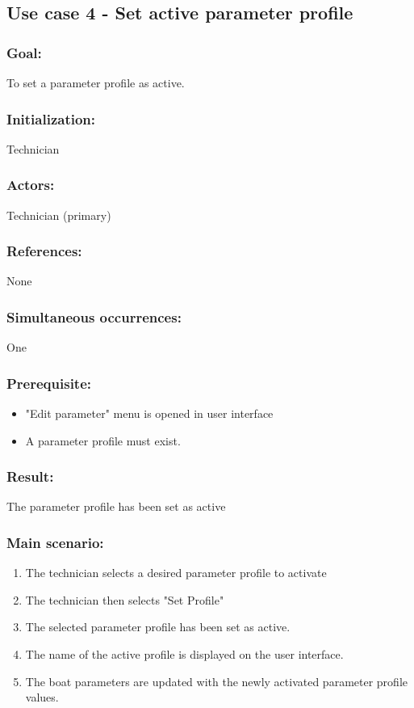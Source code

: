 \begin{framed}
	\subsection{Use case 4 - Set active parameter profile}
	\subsubsection*{Goal:}
	To set a parameter profile as active.
	
	\subsubsection*{Initialization:}
	Technician
	
	\subsubsection*{Actors:}
	Technician (primary)
	
	\subsubsection*{References:}
	None
	
	\subsubsection*{Simultaneous occurrences:}
	One
	
	\subsubsection*{Prerequisite:}
	\begin{itemize}
		\item "Edit parameter" menu is opened in user interface
		\item A parameter profile must exist.
	\end{itemize}

	\subsubsection*{Result:}
	The parameter profile has been set as active
	
	\subsubsection*{Main scenario:}
	\begin{enumerate}
		\item The technician selects a desired parameter profile to activate
		\item The technician then selects "Set Profile"
		\item The selected parameter profile has been set as active.
		\item The name of the active profile is displayed on the user interface.
		\item The boat parameters are updated with the newly activated parameter profile values.
	\end{enumerate}
\end{framed}

